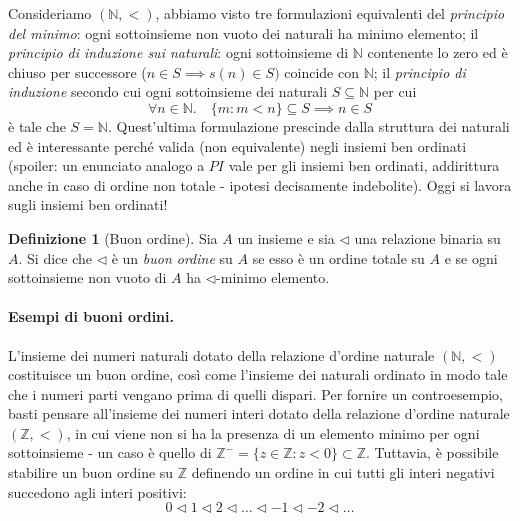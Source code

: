 \documentclass[fontsize = 11 pt, paper=A4, oneside, index=totoc, hyperref]{article}
\theoremstyle{definition}
\newtheorem{dfn}{Definizione}[section]
\theoremstyle{plain}
\newcommand{\N}{\mathbb{N}}
\begin{document}
Consideriamo \((\N, <)\), abbiamo visto tre formulazioni equivalenti del \emph{principio del minimo}: ogni sottoinsieme non vuoto dei naturali ha minimo elemento; il \emph{principio di induzione sui naturali}: ogni sottoinsieme di \(\N\) contenente lo zero ed è chiuso per successore (\(n \in S \implies s(n) \in S)\) coincide con \(\N\); il \emph{principio di induzione} secondo cui ogni sottoinsieme dei naturali \(S \subseteq \N\) per cui
\begin{equation}
  \forall n \in \N.\quad \lbrace m \colon m < n\rbrace \subseteq S \implies n \in S
\end{equation}
è tale che \(S = \N\). Quest'ultima formulazione prescinde dalla struttura dei naturali ed è interessante perché valida (non equivalente) negli insiemi ben ordinati (spoiler: un enunciato analogo a \(PI\) vale per gli insiemi ben ordinati, addirittura anche in caso di ordine non totale - ipotesi decisamente indebolite). Oggi si lavora sugli insiemi ben ordinati!

\begin{dfn}[Buon ordine]
  Sia \(A\) un insieme e sia \(\lhd\) una relazione binaria su \(A\). Si dice che \(\lhd\) è un \emph{buon ordine} su \(A\) se esso è un ordine totale su \(A\) e se ogni sottoinsieme non vuoto di \(A\) ha \(\lhd\)-minimo elemento.
\end{dfn}

\paragraph{Esempi di buoni ordini.} L'insieme dei numeri naturali dotato della relazione d'ordine naturale \((\N, <)\) costituisce un buon ordine, così come l'insieme dei naturali ordinato in modo tale che i numeri parti vengano prima di quelli dispari. Per fornire un controesempio, basti pensare all'insieme dei numeri interi dotato della relazione d'ordine naturale \((\mathbb{Z}, <)\), in cui viene non si ha la presenza di un elemento minimo per ogni sottoinsieme - un caso è quello di \(\mathbb{Z}^- = \lbrace z \in \mathbb{Z} \colon z < 0 \rbrace \subset \mathbb{Z}\). Tuttavia, è possibile stabilire un buon ordine su \(\mathbb{Z}\) definendo un ordine in cui tutti gli interi negativi succedono agli interi positivi:
\[
0 \lhd 1 \lhd 2 \lhd \dots \lhd -1 \lhd -2 \lhd \dots
\]
\end{document}
